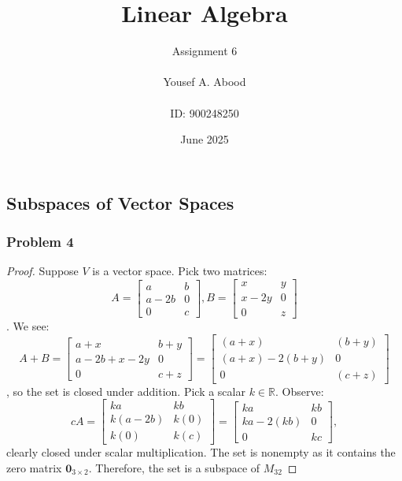 \documentclass[a4paper,12pt]{article}
\title{Linear Algebra}
\author{Assignment 6\\ \\ Yousef A. Abood\\ \\ ID: 900248250}
\date{June 2025}
\begin{document}
\maketitle
\noindent\makebox[\linewidth]{\rule{15cm}{0.4pt}}

\subsection{Subspaces of Vector Spaces}

\subsubsection*{Problem 4}
\begin{proof}
    Suppose $V$ is a vector space. Pick two matrices: \[A=\begin{bmatrix}
      a & b \\
      a-2b & 0 \\
      0 & c
    \end{bmatrix}, B=\begin{bmatrix}
      x & y \\
      x-2y & 0 \\
      0 & z
    \end{bmatrix}\]. We see: \[A+B= \begin{bmatrix}
      a+x & b+y \\
      a-2b+x-2y & 0 \\
      0 & c+z 
    \end{bmatrix} = \begin{bmatrix}
      (a+x) & (b+y) \\
      (a+x)-2(b+y) & 0 \\
      0 & (c+z)
    \end{bmatrix}\], so the set is closed under addition. Pick a scalar $k \in \mathbb{R}.$ Observe: \[cA= \begin{bmatrix}
      ka & kb \\
      k(a-2b) & k(0) \\
      k(0) & k(c)
    \end{bmatrix}= \begin{bmatrix}
      ka & kb \\
      ka-2(kb) & 0 \\
      0 & kc
    \end{bmatrix},\] clearly closed under scalar multiplication. The set is nonempty as it contains the zero matrix $\textbf{0}_{3\times 2}.$ Therefore, the set is a subspace of $M_{32}$
\end{proof}
\end{document}
